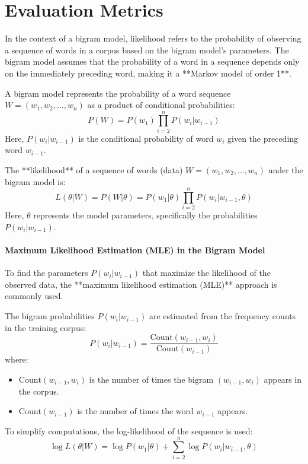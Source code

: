 \section{Evaluation Metrics}
\label{sec:nlp_eval_metrics}

In the context of a bigram model, likelihood refers to the probability of observing a sequence of words in a corpus based on the bigram model's parameters. The bigram model assumes that the probability of a word in a sequence depends only on the immediately preceding word, making it a **Markov model of order 1**.

A bigram model represents the probability of a word sequence \( W = (w_1, w_2, \ldots, w_n) \) as a product of conditional probabilities:
\[
P(W) = P(w_1) \prod_{i=2}^n P(w_i | w_{i-1})
\]
Here, \( P(w_i | w_{i-1}) \) is the conditional probability of word \( w_i \) given the preceding word \( w_{i-1} \).

The **likelihood** of a sequence of words (data) \( W = (w_1, w_2, \ldots, w_n) \) under the bigram model is:
\[
L(\theta | W) = P(W | \theta) = P(w_1 | \theta) \prod_{i=2}^n P(w_i | w_{i-1}, \theta)
\]
Here, \( \theta \) represents the model parameters, specifically the probabilities \( P(w_i | w_{i-1}) \).

\paragraph{Maximum Likelihood Estimation (MLE) in the Bigram Model}

To find the parameters \( P(w_i | w_{i-1}) \) that maximize the likelihood of the observed data, the **maximum likelihood estimation (MLE)** approach is commonly used.

The bigram probabilities \( P(w_i | w_{i-1}) \) are estimated from the frequency counts in the training corpus:
\[
P(w_i | w_{i-1}) = \frac{\text{Count}(w_{i-1}, w_i)}{\text{Count}(w_{i-1})}
\]
where:
\begin{itemize}
	\item \( \text{Count}(w_{i-1}, w_i) \) is the number of times the bigram \( (w_{i-1}, w_i) \) appears in the corpus.
	\item \( \text{Count}(w_{i-1}) \) is the number of times the word \( w_{i-1} \) appears.
\end{itemize}

To simplify computations, the log-likelihood of the sequence is used:
\[
\log L(\theta | W) = \log P(w_1 | \theta) + \sum_{i=2}^n \log P(w_i | w_{i-1}, \theta)
\]

